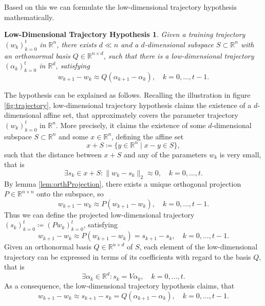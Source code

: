 \documentclass[11pt, a4paper]{article}
\newtheorem*{hypothesis}{Low-Dimensional Trajectory Hypothesis}
\newcommand{\R}{\mathbb{R}}
\begin{document}
Based on this we can formulate the low-dimensional trajectory hypothesis mathematically.

\begin{hypothesis}
Given a training trajectory $(w_k)_{k=0}^{t}$ in $\R^n$, there exists $d \ll n$ and a $d$-dimensional subspace $S \subset \R^n$ with an orthonormal basis $Q \in \R^{n \times d}$, such that there is a low-dimensional trajectory $(\alpha_k)_{k=0}^{t}$ in $\R^d$, satisfying 
\[ w_{k+1} - w_k \approx Q(\alpha_{k+1} - \alpha_k), \quad k=0, \dots, t-1. \]
\end{hypothesis}
The hypothesis can be explained as follows. Recalling the illustration in figure \ref{fig:trajectory}, low-dimensional trajectory hypothesis claims the existence of a $d$-dimensional affine set, that approximately covers the parameter trajectory $(w_k)_{k=0}^{t}$ in $\R^n$. More precisely, it claims the existence of some $d$-dimensional subspace $S \subset \R^n$ and some $x \in \R^n$, defining the affine set
\[ x + S \coloneq \big \{ y \in \R^n \mid x - y \in S \big \}, \]
such that the distance between $x + S$ and any of the parameters $w_k$ is very small, that is
\[ \exists s_k \in x + S : \big \| w_k - s_k \big \|_2 \approx 0, \quad k=0, \dots, t. \]
By lemma \ref{lem:orthProjection}, there exists a unique orthogonal projection $P \in \R^{n \times n}$ onto the subspace, so
\[ w_{k+1} - w_k \approx P(w_{k+1} - w_k), \quad k=0, \dots, t-1. \]
Thus we can define the projected low-dimensional trajectory $(s_k)_{k=0}^{t} \coloneq (Pw_k)_{k=0}^{t}$, satisfying
\[ w_{k+1} - w_k \approx P(w_{k+1} - w_k) = s_{k+1} - s_k, \quad k=0, \dots, t-1. \]
Given an orthonormal basis $Q \in \R^{n \times d}$ of $S$, each element of the low-dimensional trajectory can be expressed in terms of its coefficients with regard to the basis $Q$, that is
\[ \exists \alpha_k \in \R^{d}: s_k = V\alpha_k, \quad k=0, \dots, t. \]
As a consequence, the low-dimensional trajectory hypothesis claims, that
\[ w_{k+1} - w_k \approx s_{k+1} - s_k = Q(\alpha_{k+1} - \alpha_k), \quad k=0, \dots, t-1. \]

\end{document}
